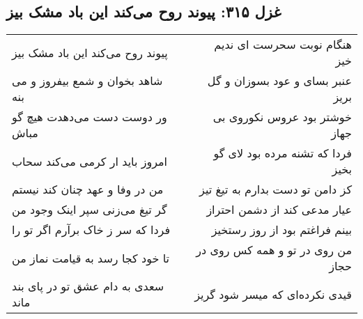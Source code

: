 \begin{center}
\section*{غزل ۳۱۵: پیوند روح می‌کند این باد مشک بیز}
\label{sec:315}
\begin{longtable}{l p{0.5cm} r}
پیوند روح می‌کند این باد مشک بیز
&&
هنگام نوبت سحرست ای ندیم خیز
\\
شاهد بخوان و شمع بیفروز و می بنه
&&
عنبر بسای و عود بسوزان و گل بریز
\\
ور دوست دست می‌دهدت هیچ گو مباش
&&
خوشتر بود عروس نکوروی بی جهاز
\\
امروز باید ار کرمی می‌کند سحاب
&&
فردا که تشنه مرده بود لای گو بخیز
\\
من در وفا و عهد چنان کند نیستم
&&
کز دامن تو دست بدارم به تیغ تیز
\\
گر تیغ می‌زنی سپر اینک وجود من
&&
عیار مدعی کند از دشمن احتراز
\\
فردا که سر ز خاک برآرم اگر تو را
&&
بینم فراغتم بود از روز رستخیز
\\
تا خود کجا رسد به قیامت نماز من
&&
من روی در تو و همه کس روی در حجاز
\\
سعدی به دام عشق تو در پای بند ماند
&&
قیدی نکرده‌ای که میسر شود گریز
\\
\end{longtable}
\end{center}
